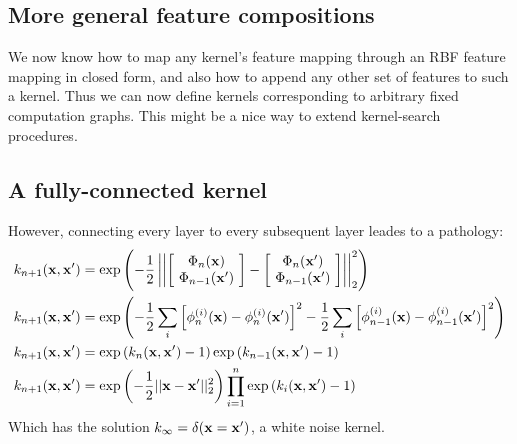 \documentclass{article}
\begin{document}
\subsection{More general feature compositions}

We now know how to map any kernel's feature mapping through an RBF feature mapping in closed form, and also how to append any other set of features to such a kernel.  Thus we can now define kernels corresponding to arbitrary fixed computation graphs.  This might be a nice way to extend kernel-search procedures.

\subsection{A fully-connected kernel}
However, connecting every layer to every subsequent layer leades to a pathology:
\begin{align}
k_{n+1}({\bf{x}}, {\bf{x}}') & = \exp \left( -\frac{1}{2} \left|\left| \left[ \! \begin{array}{c} \Phi_n({\bf{x}}) \\ \Phi_{n-1}({\bf{x}}') \end{array} \! \right]  - \left[ \! \begin{array}{c} \Phi_n({\bf{x}}') \\ \Phi_{n-1}({\bf{x}}') \end{array} \! \right] \right| \right|_2^2 \right) \\
k_{n+1}({\bf{x}}, {\bf{x}}') & = \exp \left( -\frac{1}{2} \sum_i \left[ \phi^{(i)}_n({\bf{x}}) - \phi^{(i)}_n({\bf{x}}') \right]^2 -\frac{1}{2} \sum_i \left[ \phi^{(i)}_{n-1}({\bf{x}}) - \phi^{(i)}_{n-1}({\bf{x}}') \right]^2 \right)\\
k_{n+1}({\bf{x}}, {\bf{x}}') & = \exp \left( k_n({\bf{x}}, {\bf{x}}') - 1 \right) \exp \left( k_{n-1}({\bf{x}}, {\bf{x}}') - 1 \right) \\
k_{n+1}({\bf{x}}, {\bf{x}}') & = \exp \left( -\frac{1}{2} || {\bf{x}} - {\bf{x}}' ||_2^2 \right) \prod_{i=1}^n \exp \left( k_i({\bf{x}}, {\bf{x}}') - 1 \right)
\end{align}
Which has the solution $k_\infty = \delta( {\bf{x}} = {\bf{x}}' )$, a white noise kernel.
\end{document}
